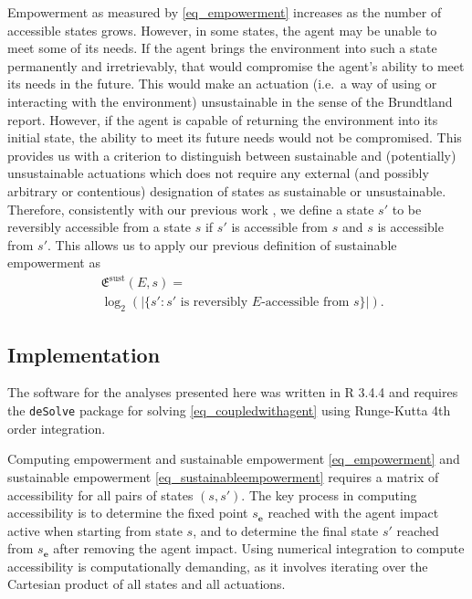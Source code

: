 \documentclass[conference]{IEEEtran}
\newcommand{\vectorsym}[1]{\ensuremath{\mathbf{#1}}}
\newcommand{\agentimpact}{\ensuremath{e}}
\newcommand{\empowerment}{\ensuremath{\mathfrak{E}}}
\newcommand{\sustainableempowerment}{\ensuremath{\empowerment^{\mathrm{sust}}}}
\begin{document}
Empowerment as measured by \eqref{eq_empowerment} increases as the
number of accessible states grows. However, in some states, the agent
may be unable to meet some of its needs. If the agent brings the
environment into such a state permanently and irretrievably, that
would compromise the agent's ability to meet its needs in the future.
This would make an actuation (i.e.\ a way of using or interacting with
the environment) unsustainable in the sense of the Brundtland
report. However, if the agent is capable of returning the
environment into its initial state, the ability to meet its future
needs would not be compromised. This provides us with a criterion to
distinguish between sustainable and (potentially) unsustainable
actuations which does not require any external (and possibly arbitrary
or contentious) designation of states as sustainable or unsustainable.
Therefore, consistently with our previous work
\cite{Kim2009_sustainability}, we define a state $s'$ to be reversibly
accessible from a state $s$ if $s'$ is accessible from $s$ and $s$ is
accessible from $s'$. This allows us to apply our previous definition
of sustainable empowerment as
\begin{equation}
  \label{eq_sustainableempowerment}
  \begin{aligned}
    & \sustainableempowerment(E, s) = \\
    & \log_2(|\{s': s' \mbox{ is
      reversibly } E\mbox{-accessible from } s\}|).
  \end{aligned}
\end{equation}


\subsection{Implementation}

The software for the analyses presented here was written in R 3.4.4
\cite{RManual2018} and requires the \texttt{deSolve} package for
solving \eqref{eq_coupledwithagent} using Runge-Kutta 4th order
integration.

Computing empowerment and sustainable empowerment \eqref{eq_empowerment}
and sustainable empowerment \eqref{eq_sustainableempowerment} requires a
matrix of accessibility for all pairs of states $(s, s')$. The key
process in computing accessibility is to determine the fixed point
$s_{\vectorsym{\agentimpact}}$ reached with the agent impact active
when starting from state $s$, and to determine the final state $s'$
reached from $s_{\vectorsym{e}}$ after removing the agent impact.
Using numerical integration to compute accessibility is
computationally demanding, as it involves iterating over the Cartesian
product of all states and all actuations.
\end{document}
